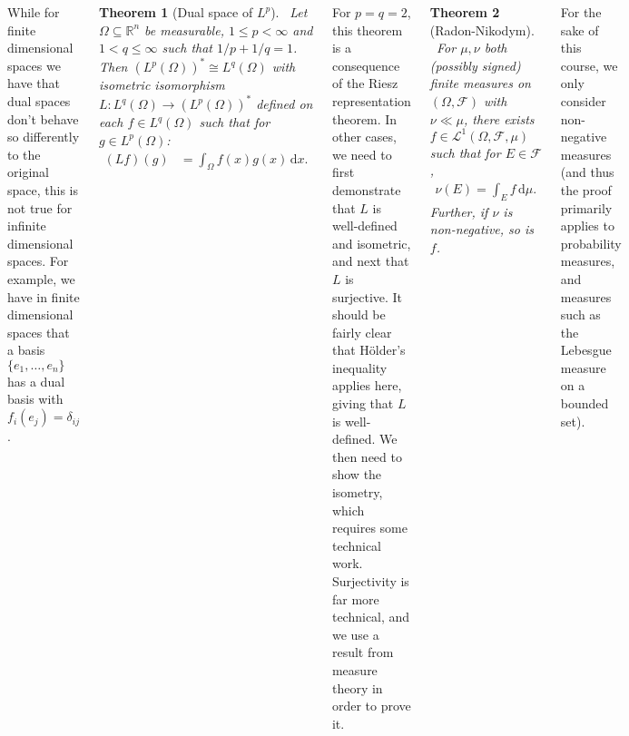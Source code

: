 \documentclass{tikzposter} %
\newtheorem{theorem}{Theorem}
\begin{document}
\begin{columns}
{    While for finite dimensional spaces we have that dual spaces don't behave so differently to the original space, this is not true for infinite dimensional spaces. For example, we have in finite dimensional spaces that a basis $\{e_{1},\dots,e_{n}\}$ has a dual basis with $f_{i}(e_{j}) = \delta_{ij}$. \\

    \begin{theorem}[Dual space of $L^{p}$]
    \ Let $\Omega \subseteq \mathbb{R}^{n}$ be measurable, $1 \le p < \infty$ and $1 < q \le \infty$ such that $1/p + 1/q = 1$. Then $(L^{p}(\Omega))^{*} \cong L^{q}(\Omega)$ with isometric isomorphism $L : L^{q}(\Omega) \to (L^{p}(\Omega))^{*}$ defined on each $f \in L^{q}(\Omega)$ such that for $g \in L^{p}(\Omega)$:
    \begin{align*}
      (Lf)(g) &= \int_{\Omega} f(x)g(x) \, \mathrm{d}x.
    \end{align*}
    \end{theorem}
    \hphantom{}

    For $p = q = 2$, this theorem is a consequence of the Riesz representation theorem. In other cases, we need to first demonstrate that $L$ is well-defined and isometric, and next that $L$ is surjective. It should be fairly clear that H\"{o}lder's inequality applies here, giving that $L$ is well-defined. We then need to show the isometry, which requires some technical work. \\

    Surjectivity is far more technical, and we use a result from measure theory in order to prove it. \\

    \begin{theorem}[Radon-Nikodym]
    \ For $\mu, \nu$ both (possibly signed) finite measures on $(\Omega, \mathcal{F})$ with $\nu \ll \mu$, there exists $f \in \mathcal{L}^{1}(\Omega, \mathcal{F}, \mu)$ such that for $E \in \mathcal{F}$,
    \begin{align*}
      \nu(E) = \int_{E} f \, \mathrm{d}\mu.
    \end{align*}
    Further, if $\nu$ is non-negative, so is $f$.
    \end{theorem}
    \hphantom{}

    For the sake of this course, we only consider non-negative measures (and thus the proof primarily applies to probability measures, and measures such as the Lebesgue measure on a bounded set). \\

}
\end{columns}
\end{document}
